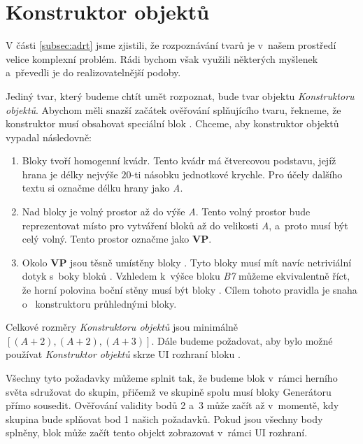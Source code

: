 
\section{Konstruktor objektů}
\label{sec:konstruktor}


V části \ref{subsec:adrt} jsme zjistili, že rozpoznávání tvarů je v~našem prostředí velice komplexní problém. Rádi bychom však využili některých myšlenek a~převedli je do realizovatelnější podoby.

Jediný tvar, který budeme chtít umět rozpoznat, bude tvar objektu \textit{Konstruktoru objektů}. Abychom měli snazší začátek ověřování splňujícího tvaru, řekneme, že konstruktor musí obsahovat speciální blok . Chceme, aby konstruktor objektů vypadal následovně:

\begin{enumerate}
	\item Bloky  tvoří homogenní kvádr. Tento kvádr má čtvercovou podstavu, jejíž hrana je délky nejvýše $20$-ti násobku jednotkové krychle. Pro účely dalšího textu si označme délku hrany jako \textit{A}.
	\item Nad bloky  je volný prostor až do výše \textit{A}. Tento volný prostor bude reprezentovat místo pro vytváření bloků až do velikosti \textit{A}, a~proto musí být celý volný. Tento prostor označme jako \textbf{VP}.
	\item Okolo \textbf{VP} jsou těsně umístěny bloky . Tyto bloky musí mít navíc netriviální dotyk s~boky bloků . Vzhledem k~výšce bloku \textit{B7} můžeme ekvivalentně říct, že horní polovina boční stěny musí být  bloky . Cílem tohoto pravidla je snaha o~ konstruktoru průhlednými bloky.
\end{enumerate}

Celkové rozměry \textit{Konstruktoru objektů} jsou minimálně\linebreak $[(A+2), (A+2), (A+3)]$. Dále budeme požadovat, aby bylo možné používat \textit{Konstruktor objektů} skrze UI rozhraní bloku .

Všechny tyto požadavky můžeme splnit tak, že budeme blok  v~rámci herního světa sdružovat do skupin, přičemž ve skupině spolu musí bloky Generátoru přímo sousedit. Ověřování validity bodů 2 a~3 může začít až v~momentě, kdy skupina bude splňovat bod 1 našich požadavků. Pokud jsou všechny body splněny, blok  může začít tento objekt zobrazovat v~rámci UI rozhraní.

